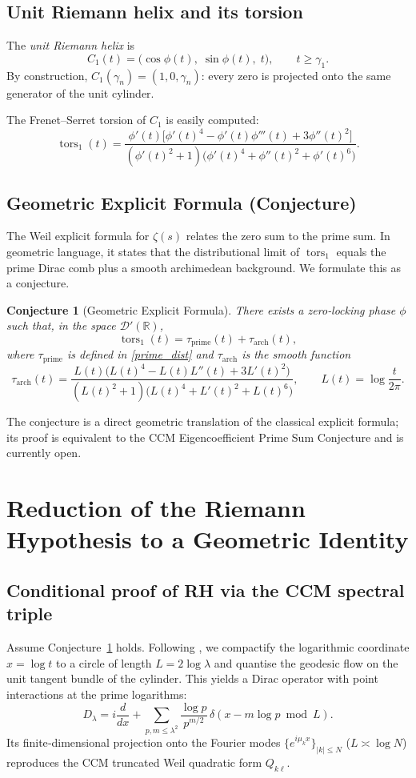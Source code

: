 \documentclass[12pt,a4paper]{article}
\newtheorem{conjecture}[theorem]{Conjecture}
\newcommand{\R}{\mathbb{R}}
\newcommand{\dist}{\mathcal{D}'}
\newcommand{\tors}{\operatorname{tors}}
\begin{document}
\subsection{Unit Riemann helix and its torsion}
The \emph{unit Riemann helix} is
\[
C_1(t) = \bigl( \cos\phi(t),\; \sin\phi(t),\; t \bigr), \qquad t \ge \gamma_1 .
\]
By construction, $C_1(\gamma_n) = (1,0,\gamma_n)$: every zero is projected onto the same generator of the unit cylinder.

The Frenet–Serret torsion of $C_1$ is easily computed:
\[
\tors_1(t) = \frac{\phi'(t)\bigl[ \phi'(t)^4 - \phi'(t)\phi'''(t) + 3\phi''(t)^2 \bigr]}
                  {(\phi'(t)^2+1)\bigl( \phi'(t)^4 + \phi''(t)^2 + \phi'(t)^6 \bigr)} . \tag{4}
\]

\subsection{Geometric Explicit Formula (Conjecture)}
The Weil explicit formula for $\zeta(s)$ relates the zero sum to the prime sum.  In geometric language, it states that the distributional limit of $\tors_1$ equals the prime Dirac comb plus a smooth archimedean background.  We formulate this as a conjecture.

\begin{conjecture}[Geometric Explicit Formula]\label{conj:geom}
There exists a zero‑locking phase $\phi$ such that, in the space $\dist(\R)$,
\[
\tors_1(t) = \tau_{\text{prime}}(t) + \tau_{\text{arch}}(t),
\tag{5}
\]
where $\tau_{\text{prime}}$ is defined in \eqref{prime_dist} and $\tau_{\text{arch}}$ is the smooth function
\[
\tau_{\text{arch}}(t) = \frac{L(t)\bigl(L(t)^4 - L(t)L''(t) + 3L'(t)^2\bigr)}
                            {(L(t)^2+1)\bigl(L(t)^4 + L'(t)^2 + L(t)^6\bigr)},
\qquad L(t)=\log\frac{t}{2\pi}.
\tag{6}
\]
\end{conjecture}

The conjecture is a direct geometric translation of the classical explicit formula; its proof is equivalent to the CCM Eigencoefficient Prime Sum Conjecture \cite{CCM} and is currently open.

\section{Reduction of the Riemann Hypothesis to a Geometric Identity}

\subsection{Conditional proof of RH via the CCM spectral triple}
Assume Conjecture~\ref{conj:geom} holds.  Following \cite{CCM}, we compactify the logarithmic coordinate $x = \log t$ to a circle of length $L = 2\log\lambda$ and quantise the geodesic flow on the unit tangent bundle of the cylinder.  This yields a Dirac operator with point interactions at the prime logarithms:
\[
D_\lambda = i\frac{d}{dx} + \sum_{p,m\le\lambda^2} \frac{\log p}{p^{m/2}} \, \delta(x - m\log p \bmod L).
\]
Its finite‑dimensional projection onto the Fourier modes $\{e^{i\mu_k x}\}_{|k|\le N}$ ($L\asymp\log N$) reproduces the CCM truncated Weil quadratic form $Q_{k\ell}$.
\end{document}
